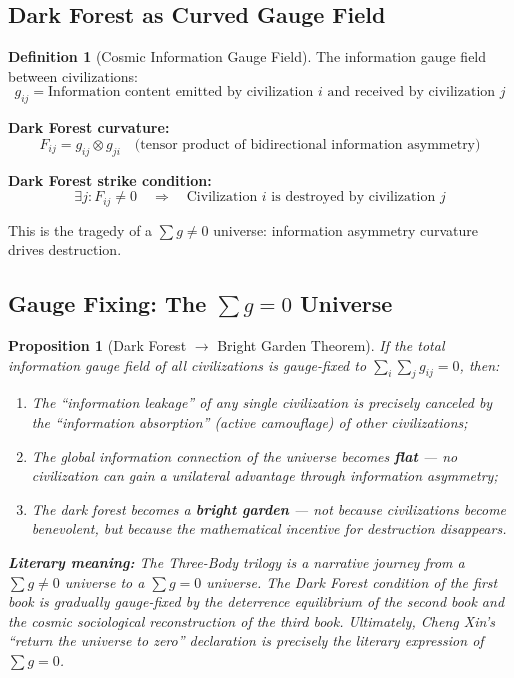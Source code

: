 \documentclass[12pt,a4paper]{article}
\theoremstyle{plain}
\newtheorem{proposition}[theorem]{Proposition}
\theoremstyle{definition}
\newtheorem{definition}[theorem]{Definition}
\begin{document}
\subsection{Dark Forest as Curved Gauge Field}

\begin{definition}[Cosmic Information Gauge Field]
The information gauge field between civilizations:
\begin{equation}
    g_{ij} = \text{Information content emitted by civilization $i$ and received by civilization $j$}
\end{equation}

\textbf{Dark Forest curvature:}
\begin{equation}
    F_{ij} = g_{ij} \otimes g_{ji} \quad \text{(tensor product of bidirectional information asymmetry)}
\end{equation}

\textbf{Dark Forest strike condition:}
\begin{equation}
    \exists j: F_{ij} \neq 0 \quad \Longrightarrow \quad \text{Civilization $i$ is destroyed by civilization $j$}
\end{equation}

This is the tragedy of a $\sum g \neq 0$ universe: information asymmetry curvature drives destruction.
\end{definition}

\subsection{Gauge Fixing: The $\sum g = 0$ Universe}

\begin{proposition}[Dark Forest $\to$ Bright Garden Theorem]
If the total information gauge field of all civilizations is gauge-fixed to $\sum_i \sum_j g_{ij} = 0$, then:
\begin{enumerate}[label=(\alph*)]
    \item The ``information leakage'' of any single civilization is precisely canceled by the ``information absorption''
    (active camouflage) of other civilizations;
    \item The global information connection of the universe becomes \textbf{flat} — no civilization can gain
    a unilateral advantage through information asymmetry;
    \item The dark forest becomes a \textbf{bright garden} — not because civilizations become benevolent,
    but because the mathematical incentive for destruction disappears.
\end{enumerate}

\textbf{Literary meaning:} The \textit{Three-Body} trilogy is a narrative journey from a $\sum g \neq 0$ universe to
a $\sum g = 0$ universe. The Dark Forest condition of the first book is gradually gauge-fixed by
the deterrence equilibrium of the second book and the cosmic sociological reconstruction of the third book. Ultimately, Cheng Xin's ``return the universe to zero''
declaration is precisely the literary expression of $\sum g = 0$.
\end{proposition}
\end{document}
